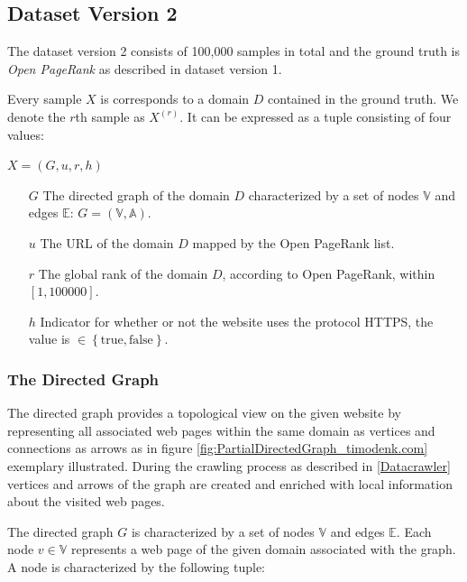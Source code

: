 \subsection{Dataset Version 2}
\label{DatasetVersion2}
The dataset version 2 consists of 100,000 samples in total and the ground truth is \textit{Open PageRank} as described in dataset version 1.

Every sample $X$ is corresponds to a domain $D$ contained in the ground truth. We denote the $r$th sample as $X^{(r)}$. It can be expressed as a tuple consisting of four values:

\begin{center}
$X = (G,u,r,h)$
\begin{itemize}
    \item[$G$] The directed graph of the domain $D$ characterized by a set of nodes $\mathbb{V}$ and edges $\mathbb{E}$: $G= \left(\mathbb{V}, \mathbb{A}\right)$.
	\item[$u$] The URL of the domain $D$ mapped by the Open PageRank list.
	\item[$r$] The global rank of the domain $D$, according to Open PageRank, within $[1, 100000]$. 
    \item[$h$] Indicator for whether or not the website uses the protocol HTTPS, the value is $\in\left\{\text{true}, \text{false}\right\}$.
\end{itemize}
\end{center}

\subsubsection{The Directed Graph}
The directed graph provides a topological view on the given website by representing all associated web pages within the same domain as vertices and connections as arrows as in figure \ref{fig:PartialDirectedGraph_timodenk.com} exemplary illustrated. During the crawling process as described in \ref{Datacrawler} vertices and arrows of the graph are created and enriched with local information about the visited web pages.

The directed graph $G$ is characterized by a set of nodes $\mathbb{V}$ and edges $\mathbb{E}$. Each node $v \in \mathbb{V}$ represents a web page of the given domain associated with the graph. A node is characterized by the following tuple:

